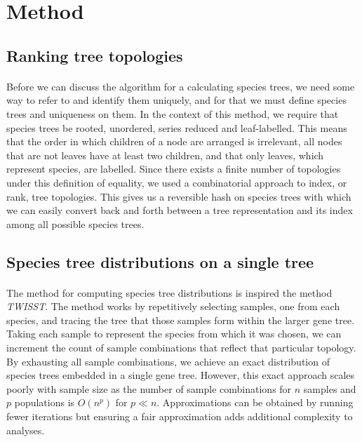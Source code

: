 \documentclass{article}
\begin{document}
\section{Method}
\subsection{Ranking tree topologies}
\paragraph{}
Before we can discuss the algorithm for a calculating species trees, we
need some way to refer to and identify them uniquely, and for that we must
define species trees and uniqueness on them. In the context of this method,
we require that species trees be rooted, unordered, series reduced
and leaf-labelled. This means that the order in which children of a node
are arranged is irrelevant, all nodes that are not leaves have at least
two children, and that only leaves, which represent species, are labelled.
Since there exists a finite number of topologies under this definition
of equality, we used a combinatorial approach to index, or rank,
tree topologies.
This gives us a reversible hash on species trees with which we can
easily convert back and forth between a tree representation and its
index among all possible species trees.

\subsection{Species tree distributions on a single tree}
\paragraph{}
The method for computing species tree distributions is inspired the method
\textit{TWISST}. The method works
by repetitively selecting samples, one from each species, and tracing the
tree that those samples form within the larger gene tree. Taking each
sample to represent the species from which it was chosen, we can increment
the count of sample combinations that reflect that particular topology.
By exhausting all sample combinations, we achieve an exact distribution
of species trees embedded in a single gene tree.
However, this exact approach scales poorly with sample size as the number
of sample combinations for $n$ samples and $p$ populations is $O(n^p)$ for
$p \ll n$. Approximations can be obtained by running fewer iterations but
ensuring a fair approximation adds additional complexity to analyses.
\end{document}

